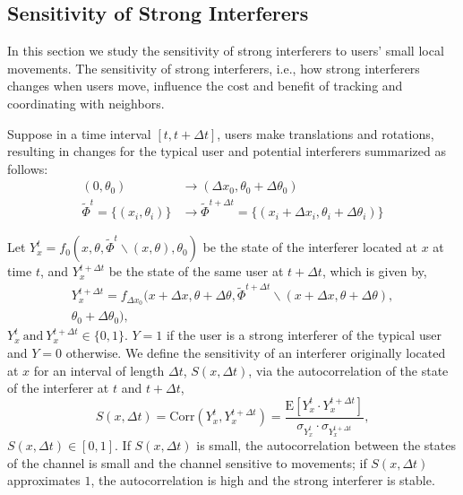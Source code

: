 \documentclass[10pt, conference, letterpaper]{IEEEtran}
\begin{document}
\subsection{Sensitivity of Strong Interferers}\label{section:channel:sensitivity}
In this section we study the sensitivity of strong interferers to users' small local movements.
The sensitivity of strong interferers, i.e., how strong interferers changes when users move, influence the cost  and benefit of tracking and coordinating with neighbors.
 
Suppose in a time interval $[t, t+ \Delta t]$, users make translations and rotations, resulting in changes for the typical user and potential interferers summarized as follows:
\begin{equation*}
\begin{split}
(0,\theta_0)&\rightarrow(\Delta x_0, \theta_0 + \Delta\theta_0) \\
\tilde{\Phi}^{t}=\{(x_i, \theta_i)\}&\rightarrow\tilde{\Phi}^{t+\Delta t}=\{(x_i+\Delta x_i, \theta_i + \Delta\theta_i)\}
\end{split}
\end{equation*}

Let $Y_x^t=f_0(x, \theta, \tilde{\Phi}^t\backslash (x, \theta), \theta_0)$ be the state of the interferer located at $x$ at time $t$, and $Y_x^{t+\Delta t}$ be the state of the same user at $t+\Delta t$, which is given by,
\begin{multline*}
Y_{x}^{t+\Delta t} = f_{\Delta x_0}(x+\Delta x, \theta + \Delta\theta, \tilde{\Phi}^{t+\Delta t}\backslash (x+\Delta x, \theta + \Delta\theta), \\
\theta_0 + \Delta\theta_0),
\end{multline*}
$Y_x^t \mathrm{~and~} Y_{x}^{t+\Delta t} \in \{0,1\}$. $Y = 1$ if the user is a strong interferer of the typical user and $Y = 0$ otherwise. We define the sensitivity of an interferer originally located at $x$ for an interval of length $\Delta t$, $S(x, \Delta t)$, via the autocorrelation of the state of the interferer at $t$ and $t+\Delta t$, 
\begin{equation}
S(x, \Delta t)
=\mathrm{Corr}(Y_x^t, Y_x^{t+\Delta t})
=\frac{\mathrm{E}[Y_x^t\cdot Y_x^{t + \Delta t}]}{\sigma_{Y_x^t}\cdot \sigma_{Y_x^{t+\Delta t}}},
\end{equation}
$S(x, \Delta t)\in [0,1]$. If $S(x, \Delta t)$ is small, the autocorrelation between the states of the channel is small and the channel sensitive to movements; if $S(x, \Delta t)$ approximates $1$, the autocorrelation is high and the strong interferer is stable.
\end{document}
